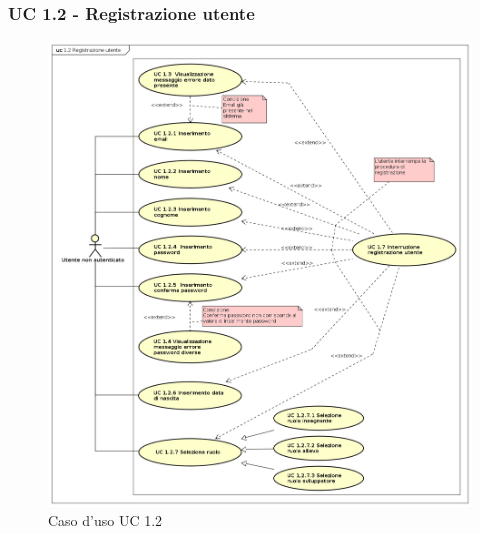 \subsubsection{UC 1.2 - Registrazione utente}
\begin{figure}[H]
	\centering
	\includegraphics[width=17cm]{img/UC12.png} 
	\caption{Caso d'uso UC 1.2}\label{fig:12}
\end{figure}
